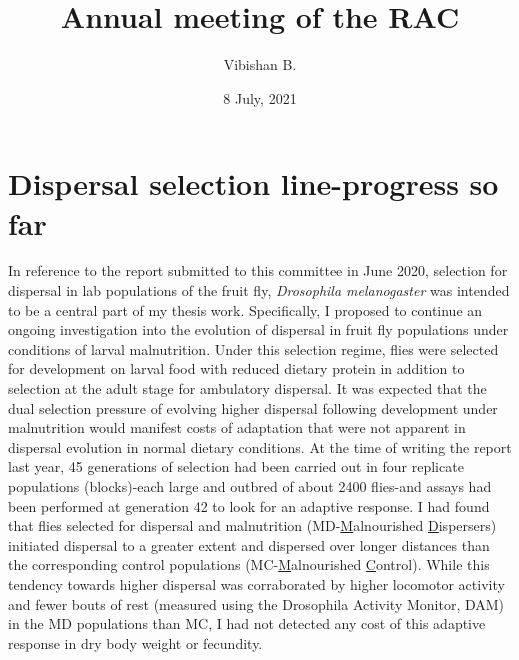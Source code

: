 \documentclass[12pt,onecolumn,twoside]{article}
\author{Vibishan B.}
\affil{Department of Biology, Indian Institute of Science Education and Research (IISER), Pune}
\title{Annual meeting of the RAC}
\date{8 July, 2021}
\begin{document}
	\maketitle
	\section{Dispersal selection line-progress so far}
	In reference to the report submitted to this committee in June 2020, selection for dispersal in lab populations of the fruit fly, \textit{Drosophila melanogaster} was intended to be a central part of my thesis work. Specifically, I proposed to continue an ongoing investigation into the evolution of dispersal in fruit fly populations under conditions of larval malnutrition. Under this selection regime, flies were selected for development on larval food with reduced dietary protein in addition to selection at the adult stage for ambulatory dispersal. It was expected that the dual selection pressure of evolving higher dispersal following development under malnutrition would manifest costs of adaptation that were not apparent in dispersal evolution in normal dietary conditions. At the time of writing the report last year, 45 generations of selection had been carried out in four replicate populations (blocks)-each large and outbred of about 2400 flies-and assays had been performed at generation 42 to look for an adaptive response. I had found that flies selected for dispersal and malnutrition (MD-\underline{M}alnourished \underline{D}ispersers) initiated dispersal to a greater extent and dispersed over longer distances than the corresponding control populations (MC-\underline{M}alnourished \underline{C}ontrol). While this tendency towards higher dispersal was corraborated by higher locomotor activity and fewer bouts of rest (measured using the Drosophila Activity Monitor, DAM) in the MD populations than MC, I had not detected any cost of this adaptive response in dry body weight or fecundity.
\end{document}
